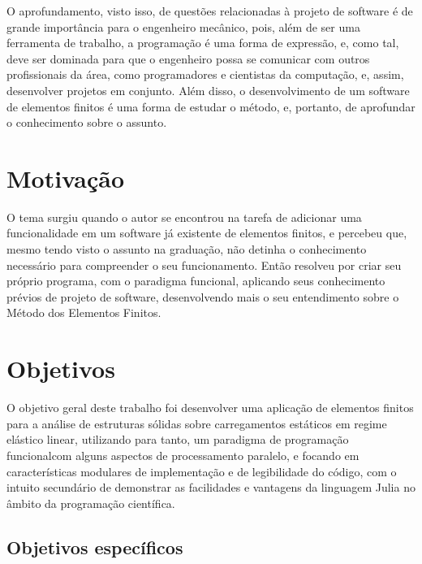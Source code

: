 O aprofundamento, visto isso, de questões relacionadas à projeto de software é de grande importância para o engenheiro mecânico, pois, além de ser uma ferramenta de trabalho, a programação é uma forma de expressão, e, como tal, deve ser dominada para que o engenheiro possa se comunicar com outros profissionais da área, como programadores e cientistas da computação, e, assim, desenvolver projetos em conjunto. Além disso, o desenvolvimento de um software de elementos finitos é uma forma de estudar o método, e, portanto, de aprofundar o conhecimento sobre o assunto.


\section{Motivação}

O tema surgiu quando o autor se encontrou na tarefa de adicionar uma funcionalidade em um software já existente de elementos finitos, e percebeu que, mesmo tendo visto o assunto na graduação, não detinha o conhecimento necessário para compreender o seu funcionamento. Então resolveu por criar seu próprio programa, com o paradigma funcional, aplicando seus conhecimento prévios de projeto de software, desenvolvendo mais o seu entendimento sobre o Método dos Elementos Finitos.


\section{Objetivos}

O objetivo geral deste trabalho foi desenvolver uma aplicação de elementos finitos para a análise de estruturas sólidas sobre carregamentos estáticos em regime elástico linear, utilizando para tanto, um paradigma de programação funcional\footnotemark[1] com alguns aspectos de processamento paralelo, e focando em características modulares de implementação e de legibilidade do código, com o intuito secundário de demonstrar as facilidades e vantagens da linguagem Julia no âmbito da programação científica.


\subsection{Objetivos específicos}

